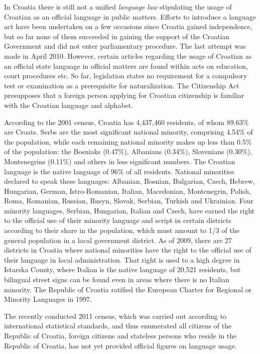\begin{multicols}{2}
In Croatia there is still not a unified \emph{language law} stipulating the usage of Croatian as an official language in public matters. Efforts to introduce a language act have been undertaken on a few occasions since Croatia gained independence, but so far none of them succeeded in gaining the support of the Croatian Government and did not enter parliamentary procedure. The last attempt was made in April 2010. However, certain articles regarding the usage of Croatian as an official state language in official matters are found within acts on education, court procedures etc. So far, legislation states no requirement for a compulsory test or examination as a prerequisite for naturalization. The Citizenship Act \cite{str6}  presupposes that a foreign person applying for Croatian citizenship is familiar with the Croatian language and alphabet.

According to the 2001 census, Croatia has 4,437,460 residents, of whom 89.63\% are Croats. Serbs are the most significant national minority, comprising 4.54\% of the population, while each remaining national minority makes up less than 0.5\% of the population: the Bosniaks (0.47\%), Albanians (0.34\%), Slovenians (0.30\%), Montenegrins (0.11\%) and others in less significant numbers. The Croatian language is the native language of 96\% of all residents. National minorities declared to speak these languages: Albanian, Bosnian, Bulgarian, Czech, Hebrew, Hungarian, German, Istro-Romanian, Italian, Macedonian, Montenegrin, Polish, Roma, Romanian, Russian, Rusyn, Slovak, Serbian, Turkish and Ukrainian. Four minority languages, Serbian, Hungarian, Italian and Czech, have earned the right to the official use of their minority language and script in certain districts according to their share in the population, which must amount to 1/3 of the general population in a local government district. As of 2009, there are 27 districts in Croatia where national minorities have the right to the official use of their language in local administration. That right is used to a high degree in Istarska County, where Italian is the native language of 20,521 residents, but bilingual street signs can be found even in areas where there is no Italian minority. The Republic of Croatia ratified the European Charter for Regional or Minority Languages in 1997.

The recently conducted 2011 census, which was carried out according to international statistical standards, and thus enumerated all citizens of the Republic of Croatia, foreign citizens and stateless persons who reside in the Republic of Croatia, has not yet provided official figures on language usage.


\end{multicols}
